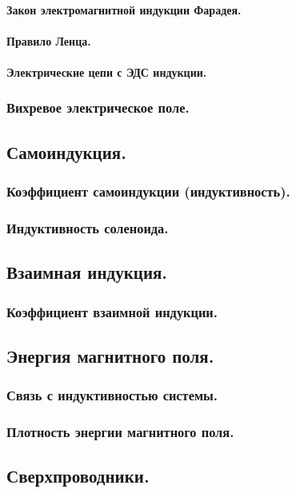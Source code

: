 \documentclass{article}
\begin{document}
            \paragraph{Закон электромагнитной индукции Фарадея.}
            \paragraph{Правило Ленца.}
            \paragraph{Электрические цепи с ЭДС индукции.}
        \subsubsection{Вихревое электрическое поле.}
    \subsection{Самоиндукция.}
        \subsubsection{Коэффициент самоиндукции (индуктивность).}
        \subsubsection{Индуктивность соленоида.}
    \subsection{Взаимная индукция.}
        \subsubsection{Коэффициент взаимной индукции.}
    \subsection{Энергия магнитного поля.}
        \subsubsection{Связь с индуктивностью системы.}
        \subsubsection{Плотность энергии магнитного поля.}
    \subsection{Сверхпроводники.}
\end{document}
